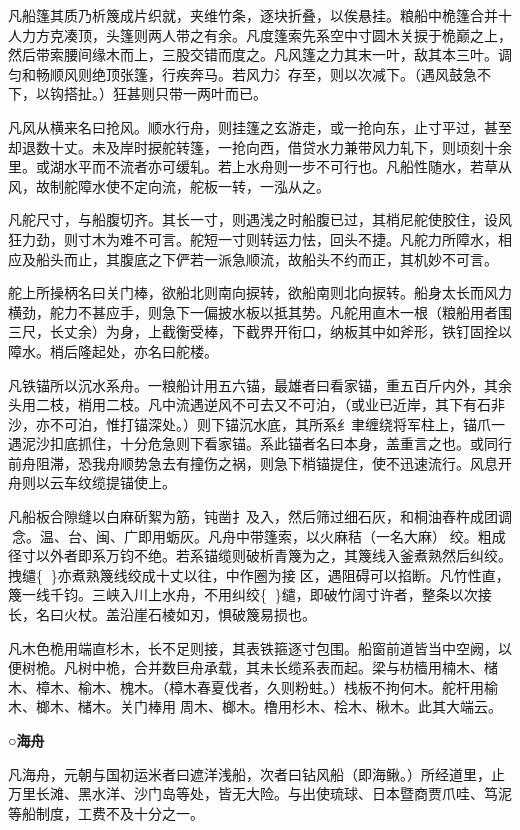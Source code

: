 \documentclass[]{article}
\begin{document}
凡船篷其质乃析篾成片织就，夹维竹条，逐块折叠，以俟悬挂。粮船中桅篷合并十人力方克凑顶，头篷则两人带之有余。凡度篷索先系空中寸圆木关捩于桅巅之上，然后带索腰间缘木而上，三股交错而度之。凡风篷之力其末一叶，敌其本三叶。调匀和畅顺风则绝顶张篷，行疾奔马。若风力氵存至，则以次减下。（遇风鼓急不下，以钩搭扯。）狂甚则只带一两叶而已。

凡风从横来名曰抢风。顺水行舟，则挂篷之玄游走，或一抢向东，止寸平过，甚至却退数十丈。未及岸时捩舵转篷，一抢向西，借贷水力兼带风力轧下，则顷刻十余里。或湖水平而不流者亦可缓轧。若上水舟则一步不可行也。凡船性随水，若草从风，故制舵障水使不定向流，舵板一转，一泓从之。

凡舵尺寸，与船腹切齐。其长一寸，则遇浅之时船腹已过，其梢尼舵使胶住，设风狂力劲，则寸木为难不可言。舵短一寸则转运力怯，回头不捷。凡舵力所障水，相应及船头而止，其腹底之下俨若一派急顺流，故船头不约而正，其机妙不可言。

舵上所操柄名曰关门棒，欲船北则南向捩转，欲船南则北向捩转。船身太长而风力横劲，舵力不甚应手，则急下一偏披水板以抵其势。凡舵用直木一根（粮船用者围三尺，长丈余）为身，上截衡受棒，下截界开衔口，纳板其中如斧形，铁钉固拴以障水。梢后隆起处，亦名曰舵楼。

凡铁锚所以沉水系舟。一粮船计用五六锚，最雄者曰看家锚，重五百斤内外，其余头用二枝，梢用二枝。凡中流遇逆风不可去又不可泊，（或业已近岸，其下有石非沙，亦不可泊，惟打锚深处。）则下锚沉水底，其所系纟聿缠绕将军柱上，锚爪一遇泥沙扣底抓住，十分危急则下看家锚。系此锚者名曰本身，盖重言之也。或同行前舟阻滞，恐我舟顺势急去有撞伤之祸，则急下梢锚提住，使不迅速流行。风息开舟则以云车纹缆提锚使上。

凡船板合隙缝以白麻斫絮为筋，钝凿扌及入，然后筛过细石灰，和桐油舂杵成团调念。温、台、闽、广即用蛎灰。凡舟中带篷索，以火麻秸（一名大麻）绞。粗成径寸以外者即系万钧不绝。若系锚缆则破析青篾为之，其篾线入釜煮熟然后纠绞。拽缱\{\}亦煮熟篾线绞成十丈以往，中作圈为接区，遇阻碍可以掐断。凡竹性直，篾一线千钧。三峡入川上水舟，不用纠绞\{\}缱，即破竹阔寸许者，整条以次接长，名曰火杖。盖沿崖石棱如刃，惧破篾易损也。

凡木色桅用端直杉木，长不足则接，其表铁箍逐寸包围。船窗前道皆当中空阙，以便树桅。凡树中桅，合并数巨舟承载，其未长缆系表而起。梁与枋樯用楠木、槠木、樟木、榆木、槐木。（樟木春夏伐者，久则粉蛀。）栈板不拘何木。舵杆用榆木、榔木、槠木。关门棒用周木、榔木。橹用杉木、桧木、楸木。此其大端云。

\textbf{○海舟}

凡海舟，元朝与国初运米者曰遮洋浅船，次者曰钻风船（即海鳅。）所经道里，止万里长滩、黑水洋、沙门岛等处，皆无大险。与出使琉球、日本暨商贾爪哇、笃泥等船制度，工费不及十分之一。
\end{document}
